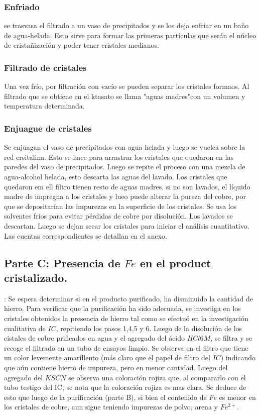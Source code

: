 \documentclass[a4paper,12pt]{article}
\begin{document}
   \subsubsection{Enfriado} se trasvasa el filtrado a un vaso de precipitados y se los deja enfriar en un baño de agua-helada. Esto sirve para formar las primeras partículas que serán el núcleo de cristañización y poder tener cristales medianos.
   
   \subsubsection{Filtrado de cristales} Una vez frío, por filtración con vacío se pueden separar los cristales formaos. Al filtrado que se obtiene en el ktasato se llama "aguas madres"con un volumen y temperatura determinada.
   
   \subsubsection{Enjuague de cristales} Se enjuagan el vaso de precipitados con agua helada y luego se vuelca sobre la red crsitalina. Esto se hace para arrastrar los cristales que quedaron en las paredes del vaso de precipitados. Luego se repite el proceso con una mezcla de agua-alcohol helada, esto descarta las aguas del lavado. Los cristales que quedaron em ell filtro tienen resto de aguas madres, si no son lavados, el líquido madre de impregna a los cristales y lueo puede alterar la pureza del cobre, por que se depositarían las impurezas en la superficie de los cristales. Se usa los solventes fríos para evitar pérdidas de cobre por disolución. Los lavados se descartan. Luego se dejan secar los cristales para iniciar el análisis cuantitativo. Las cuentas correspondientes se detallan en el anexo.

 \subsection{Parte C: Presencia de $Fe$ en el product cristalizado.}: Se espera determinar si en el producto purificado, ha disminuido la cantidad de hierro.
 Para verificar que la purificación ha sido adecuada, se investiga en los cristales obtenidos la presencia de hierro tal como se efectuó en la investigación cualitativa de $IC$, repitiendo los pasos 1,4,5 y 6.
 Luego de la disolución de los cistales de cobre prificados en agua y el agregado del ácido $HCl 6M$, se filtra y se recoge el filtrado en un tubo de ensayos limpio. Se observa en el filtro que tiene un color levemente amarillento (más claro que el papel de filtro del $IC$) indicando que aún contiene hierro de impureza, pero en menor cantidad. Luego  del agregado del $KSCN$ se observa una coloración rojiza que, al compararlo con el tubo testigo del IC, se nota que la coloración rojiza es mas clara. Se deduce de esto que luego de la purificación (parte B), si bien el contenido de $Fe$ es menor en los cristales de cobre, aun sigue teniendo impurezas de polvo, arena y $Fe^{2+}$.
 
\end{document}

